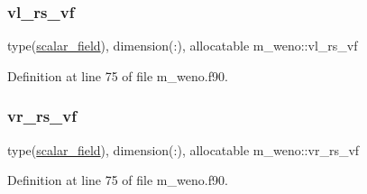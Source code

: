 \subsubsection{\texorpdfstring{vl\+\_\+rs\+\_\+vf}{vl\_rs\_vf}}
{\footnotesize\ttfamily type(\hyperlink{structm__derived__types_1_1scalar__field}{scalar\+\_\+field}), dimension(\+:), allocatable m\+\_\+weno\+::vl\+\_\+rs\+\_\+vf}



Definition at line 75 of file m\+\_\+weno.\+f90.

\mbox{\label{namespacem__weno_ad1481768af62b47f857535c4a08f20d0}} 
\subsubsection{\texorpdfstring{vr\+\_\+rs\+\_\+vf}{vr\_rs\_vf}}
{\footnotesize\ttfamily type(\hyperlink{structm__derived__types_1_1scalar__field}{scalar\+\_\+field}), dimension(\+:), allocatable m\+\_\+weno\+::vr\+\_\+rs\+\_\+vf}



Definition at line 75 of file m\+\_\+weno.\+f90.

